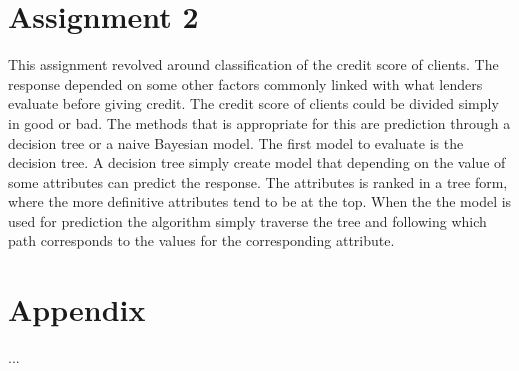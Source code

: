 \documentclass[a4paper, twocolumn]{article}
\begin{document}
    \section*{Assignment 2}
	This assignment revolved around classification of the credit score of clients. The response depended on some other factors commonly linked with what lenders evaluate before giving credit. 
	The credit score of clients could be divided simply in good or bad.\newline
    The methods that is appropriate for this are prediction through a decision tree or a naive Bayesian model. The first model to evaluate is the decision tree. A decision tree simply create  
	model that depending on the value of some attributes can predict the response. The attributes is ranked in a tree form, where the more definitive attributes tend to be at the top. When the 
	the model is used for prediction the algorithm simply traverse the tree and following which path corresponds to the values for the corresponding attribute.

    \nocite{*} %
    
    
    \onecolumn \appendix
    \section*{Appendix}

        ...
\end{document}
